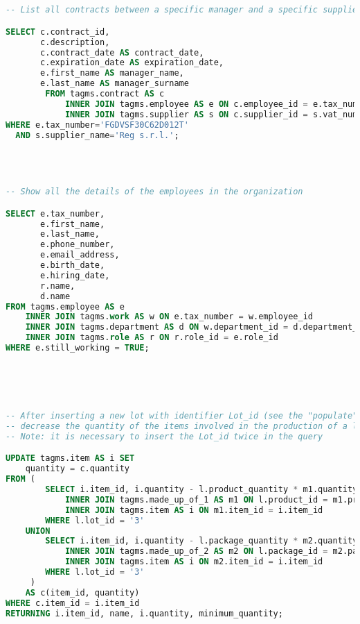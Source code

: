 \begin{lstlisting}[language=SQL,
keywordstyle=\color{blue},
stringstyle=\color{mauve},
showstringspaces=false,
breaklines=true,
basicstyle=\ttfamily\footnotesize]


-- List all contracts between a specific manager and a specific supplier.

SELECT c.contract_id,
       c.description,
       c.contract_date AS contract_date,
       c.expiration_date AS expiration_date,
       e.first_name AS manager_name,
       e.last_name AS manager_surname
		FROM tagms.contract AS c
		    INNER JOIN tagms.employee AS e ON c.employee_id = e.tax_number
		    INNER JOIN tagms.supplier AS s ON c.supplier_id = s.vat_number
WHERE e.tax_number='FGDVSF30C62D012T'
  AND s.supplier_name='Reg s.r.l.';




-- Show all the details of the employees in the organization

SELECT e.tax_number,
       e.first_name,
       e.last_name,
       e.phone_number,
       e.email_address,
       e.birth_date,
       e.hiring_date,
       r.name,
       d.name
FROM tagms.employee AS e
    INNER JOIN tagms.work AS w ON e.tax_number = w.employee_id
    INNER JOIN tagms.department AS d ON w.department_id = d.department_id
    INNER JOIN tagms.role AS r ON r.role_id = e.role_id
WHERE e.still_working = TRUE;





-- After inserting a new lot with identifier Lot_id (see the "populate" section)
-- decrease the quantity of the items involved in the production of a lot
-- Note: it is necessary to insert the Lot_id twice in the query

UPDATE tagms.item AS i SET
    quantity = c.quantity
FROM (
        SELECT i.item_id, i.quantity - l.product_quantity * m1.quantity AS quantity FROM tagms.lot AS l
            INNER JOIN tagms.made_up_of_1 AS m1 ON l.product_id = m1.product_id
            INNER JOIN tagms.item AS i ON m1.item_id = i.item_id
        WHERE l.lot_id = '3'
    UNION
        SELECT i.item_id, i.quantity - l.package_quantity * m2.quantity AS quantity FROM tagms.lot AS l
            INNER JOIN tagms.made_up_of_2 AS m2 ON l.package_id = m2.package_id
            INNER JOIN tagms.item AS i ON m2.item_id = i.item_id
        WHERE l.lot_id = '3'
     )
    AS c(item_id, quantity)
WHERE c.item_id = i.item_id
RETURNING i.item_id, name, i.quantity, minimum_quantity;





\end{lstlisting}
